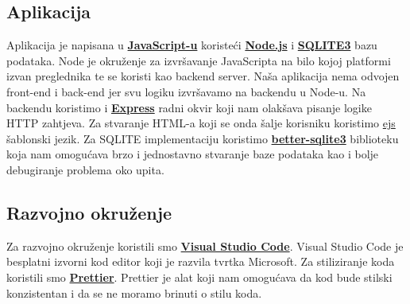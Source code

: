 		\subsection*{Aplikacija}
			Aplikacija je napisana u \textbf{\href{https://developer.mozilla.org/en-US/docs/Web/JavaScript}{JavaScript-u}} koristeći \textbf{\href{https://nodejs.org/en}{Node.js}} i \textbf{\href{https://www.npmjs.com/package/better-sqlite3}{SQLITE3}} bazu podataka. Node je okruženje za izvršavanje JavaScripta na bilo kojoj platformi izvan preglednika te se koristi kao backend server. Naša aplikacija nema odvojen front-end i back-end jer svu logiku izvršavamo na backendu u Node-u. Na backendu koristimo i \textbf{\href{https://expressjs.com/}{Express}} radni okvir koji nam olakšava pisanje logike HTTP zahtjeva. Za stvaranje HTML-a koji se onda šalje korisniku koristimo \href{https://ejs.co/}{ejs} šablonski jezik. Za SQLITE implementaciju koristimo \textbf{\href{https://www.npmjs.com/package/better-sqlite3}{better-sqlite3}} biblioteku koja nam omogućava brzo i jednostavno stvaranje baze podataka kao i bolje debugiranje problema oko upita.

		\subsection*{Razvojno okruženje}
			Za razvojno okruženje koristili smo \textbf{\href{https://code.visualstudio.com/}{Visual Studio Code}}. Visual Studio Code je besplatni izvorni kod editor koji je razvila tvrtka Microsoft. Za stiliziranje koda koristili smo \textbf{\href{https://prettier.io/}{Prettier}}. Prettier je alat koji nam omogućava da kod bude stilski konzistentan i da se ne moramo brinuti o stilu koda.

